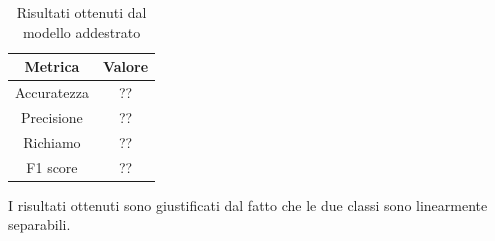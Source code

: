 \begin{table}[ht]
    \centering
    \begin{tabular}{|c|c|}
        \hline
        \textbf{Metrica} & \textbf{Valore} \\
        \hline
        Accuratezza & ?? \\
        \hline
        Precisione & ?? \\
        \hline
        Richiamo & ?? \\
        \hline
        F1 score & ?? \\
        \hline
    \end{tabular}
    \caption{Risultati ottenuti dal modello addestrato}
    \label{tab:risultatiReteNeurale}
\end{table}

I risultati ottenuti sono giustificati dal fatto che le due classi sono linearmente
separabili.

